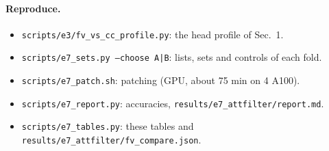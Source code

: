 \documentclass[10pt,a4paper]{article}
\begin{document}
\paragraph{Reproduce.}
\begin{itemize}
\item \texttt{scripts/e3/fv\_vs\_cc\_profile.py}: the head profile of Sec.~1.
\item \texttt{scripts/e7\_sets.py --choose A|B}: lists, sets and controls of each fold.
\item \texttt{scripts/e7\_patch.sh}: patching (GPU, about 75 min on 4 A100).
\item \texttt{scripts/e7\_report.py}: accuracies, \texttt{results/e7\_attfilter/report.md}.
\item \texttt{scripts/e7\_tables.py}: these tables and \texttt{results/e7\_attfilter/fv\_compare.json}.
\end{itemize}
\end{document}
